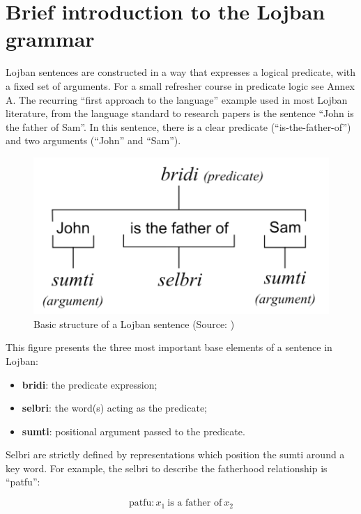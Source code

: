 \section{Brief introduction to the Lojban grammar}

Lojban sentences are constructed in a way that expresses a logical predicate, with a fixed set of arguments. For a small
refresher course in predicate logic see Annex A. The recurring ``first approach to the language'' example used in most Lojban
literature, from the language standard to research papers is the sentence ``John is the father of Sam''. In this sentence, there
is a clear predicate (``is-the-father-of'') and two arguments (``John'' and ``Sam'').

\begin{figure}[H]
\centering
\includegraphics[scale=0.20]{images/lojban_grammar.png}
\caption{Basic structure of a Lojban sentence (Source: \cite{cowan1997complete})}
\end{figure}

This figure presents the three most important base elements of a sentence in Lojban:

\begin{itemize}
    \item \textbf{bridi}: the predicate expression;
    \item \textbf{selbri}: the word(s) acting as the predicate;
    \item \textbf{sumti}: positional argument passed to the predicate.
\end{itemize}

Selbri are strictly defined by representations which position the sumti around a key word. For example, the selbri to describe the fatherhood relationship is ``patfu'':

$$\text{patfu}: x_1 \: \text{is a father of} \: x_2$$

